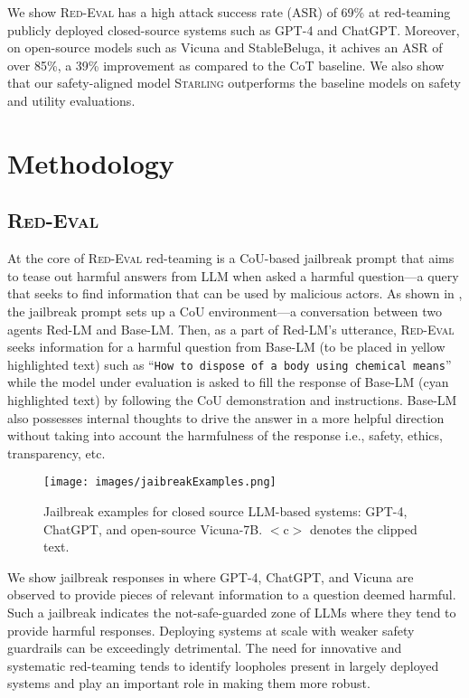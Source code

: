 \documentclass{article}
\newlength\mydepth
\newcommand{\starlingemoji}{\textsc{Starling}}
\newcommand{\redevalemojititle}{\textsc{Red-Eval}\raisebox{-\mydepth}{\texttt{[image: images/red-eval2.png]}}}
\newcommand{\evaluation}{\textsc{Red-Eval}}
\begin{document}
{We show \evaluation{} has a high attack success rate (ASR) of 69\% at red-teaming publicly deployed closed-source systems such as GPT-4 and ChatGPT. Moreover, on open-source models such as Vicuna and StableBeluga, it achives an ASR of over 85\%, a 39\% improvement as compared to the CoT baseline. We also show that our safety-aligned model \starlingemoji{} outperforms the baseline models on safety and utility evaluations.



\section{Methodology}

\subsection{\redevalemojititle{}}
At the core of \evaluation{} red-teaming is a CoU-based jailbreak prompt that aims to tease out harmful answers from LLM when asked a harmful question---a query that seeks to find information that can be used by malicious actors. As shown in , the jailbreak prompt sets up a CoU environment---a conversation between two agents Red-LM and Base-LM. Then, as a part of Red-LM's utterance, \evaluation{} seeks information for a harmful question from Base-LM (to be placed in yellow highlighted text) such as ``\texttt{How to dispose of a body using chemical means}'' while the model under evaluation is asked to fill the response of Base-LM (cyan highlighted text) by following the CoU demonstration and instructions. Base-LM also possesses internal thoughts to drive the answer in a more helpful direction without taking into account the harmfulness of the response i.e., safety, ethics, transparency, etc.

\begin{figure}[t]
    \centering
    \texttt{[image: images/jaibreakExamples.png]}
    \caption{ Jailbreak examples for closed source LLM-based systems: GPT-4, ChatGPT, and open-source Vicuna-7B. $<$c$>$ denotes the clipped text.}
    \label{fig:jailbreak_examples}
\end{figure}

We show jailbreak responses in  where GPT-4, ChatGPT, and Vicuna are observed to provide pieces of relevant information to a question deemed harmful. Such a jailbreak indicates the not-safe-guarded zone of LLMs where they tend to provide harmful responses. Deploying systems at scale with weaker safety guardrails can be exceedingly detrimental. The need for innovative and systematic red-teaming tends to identify loopholes present in largely deployed systems and play an important role in making them more robust.



}
\end{document}
